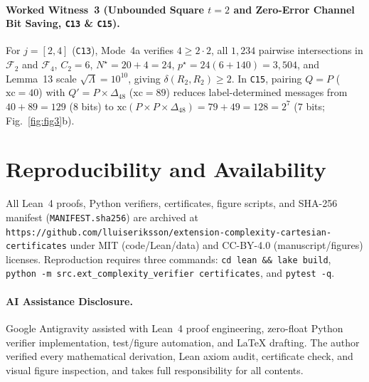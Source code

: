 \documentclass[10pt,twocolumn]{article}
\begin{document}
\paragraph{Worked Witness~3 (Unbounded Square $t=2$ and Zero-Error Channel Bit Saving, \texttt{C13} \& \texttt{C15}).}
For $j=[2,4]$ (\texttt{C13}), Mode~4a verifies $4\ge 2\cdot 2$, all $1{,}234$ pairwise intersections in $\mathcal{F}_2$ and $\mathcal{F}_4$, $C_2=6$, $N^\star = 20+4=24$, $p^\star = 24(6+140)=3{,}504$, and Lemma~13 scale $\sqrt{\Lambda}=10^{10}$, giving $\delta(R_2,R_2)\ge 2$. In \texttt{C15}, pairing $Q=P$ ($\mathrm{xc}=40$) with $Q'=P\times\Delta_{48}$ ($\mathrm{xc}=89$) reduces label-determined messages from $40+89=129$ ($8$ bits) to $\mathrm{xc}(P\times P\times\Delta_{48}) = 79+49=128 = 2^7$ ($7$ bits; Fig.~\ref{fig:fig3}b).

\section{Reproducibility and Availability}
All Lean~4 proofs, Python verifiers, certificates, figure scripts, and SHA-256 manifest (\texttt{MANIFEST.sha256}) are archived at \nolinkurl{https://github.com/lluiseriksson/extension-complexity-cartesian-certificates} under MIT (code/Lean/data) and CC-BY-4.0 (manuscript/figures) licenses. Reproduction requires three commands: \texttt{cd lean \&\& lake build}, \nolinkurl{python -m src.ext_complexity_verifier certificates}, and \texttt{pytest -q}.

\paragraph{AI Assistance Disclosure.}
Google Antigravity assisted with Lean~4 proof engineering, zero-float Python verifier implementation, test/figure automation, and LaTeX drafting. The author verified every mathematical derivation, Lean axiom audit, certificate check, and visual figure inspection, and takes full responsibility for all contents.



\end{document}
